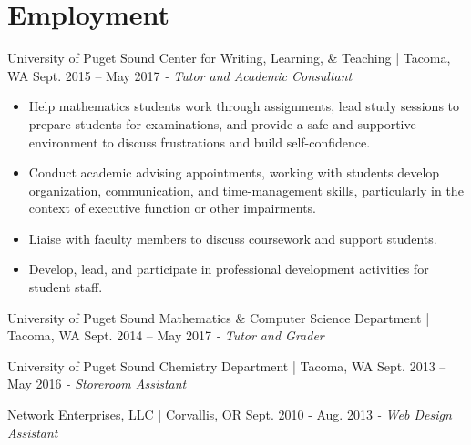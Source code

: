 \section{Employment}
University of Puget Sound Center for Writing, Learning, \& Teaching | Tacoma, WA \hfill Sept. 2015 – May 2017 \newline
\textit{ - Tutor and Academic Consultant}  \\
 \vspace{-4.5mm}
 \begin{itemize}
 \item Help mathematics students work through assignments, lead study sessions to prepare students for examinations, and provide a safe and supportive environment to discuss frustrations and build self-confidence.
 \item Conduct academic advising appointments, working with students develop organization, communication, and time-management skills, particularly in the context of executive function or other impairments.
 \item Liaise with faculty members to discuss coursework and support students.
 \item Develop, lead, and participate in professional development activities for student staff.
 \end{itemize}
\vspace{-3.5mm}
University of Puget Sound Mathematics \& Computer Science Department | Tacoma, WA \hfill  Sept. 2014 – May 2017 \newline
\textit{- Tutor and Grader} \\
  \vspace{-4.5mm}
    \vspace{-3.5mm}

University of Puget Sound Chemistry Department | Tacoma, WA \hfill Sept. 2013 – May 2016 \newline
\textit{- Storeroom Assistant} \\
  \vspace{-4.5mm}
    \vspace{-3.5mm}

Network Enterprises, LLC | Corvallis, OR \hfill Sept. 2010 - Aug. 2013 \newline
\textit{- Web Design Assistant} \hfill
    \vspace{-3.5mm}
